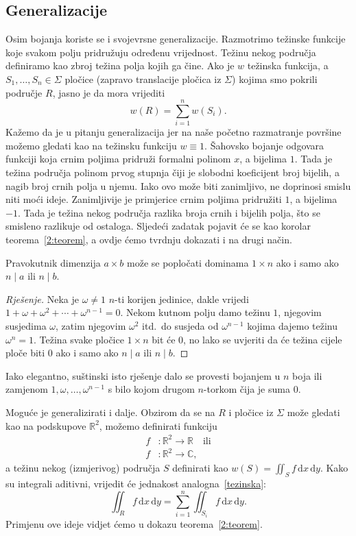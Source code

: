 \documentclass[11pt]{scrartcl}
\newcommand{\D}{\,\mathrm d}
\begin{document}
\subsection{Generalizacije}
Osim bojanja koriste se i svojevrsne generalizacije. Razmotrimo težinske funkcije koje svakom polju pridružuju određenu vrijednost. Težinu nekog područja definiramo kao zbroj težina polja kojih ga čine. Ako je $w$ težinska funkcija, a $S_1, \ldots, S_n \in \Sigma$ pločice (zapravo translacije pločica iz $\Sigma$) kojima smo pokrili područje $R$, jasno je da mora vrijediti
\begin{equation}\label{tezinska}
w(R) = \sum_{i = 1}^n w(S_i).
\end{equation}
Kažemo da je u pitanju generalizacija jer na naše početno razmatranje površine možemo gledati kao na težinsku funkciju $w \equiv 1$. Šahovsko bojanje odgovara funkciji koja crnim poljima pridruži formalni polinom $x$, a bijelima $1$. Tada je težina područja polinom prvog stupnja čiji je slobodni koeficijent broj bijelih, a nagib broj crnih polja u njemu. Iako ovo može biti zanimljivo, ne doprinosi smislu niti moći ideje. Zanimljivije je primjerice crnim poljima pridružiti $1$, a bijelima $-1$. Tada je težina nekog područja razlika broja crnih i bijelih polja, što se smisleno razlikuje od ostaloga. Sljedeći zadatak pojavit će se kao korolar teorema~\ref{2:teorem}, a ovdje ćemo tvrdnju dokazati i na drugi način.

\begin{zadatak}
Pravokutnik dimenzija $a \times b$ može se popločati dominama $1 \times n$ ako i samo ako $n \mid a$ ili $n \mid b$.
\end{zadatak}
\begin{proof}[Rješenje]
Neka je $\omega \neq 1$ $n$-ti korijen jedinice, dakle vrijedi $1 + \omega +\omega^2 + \dotsb + \omega^{n-1} = 0$. Nekom kutnom polju damo težinu $1$, njegovim susjedima $\omega$, zatim njegovim $\omega^2$ itd.\ do susjeda od $\omega^{n-1}$ kojima dajemo težinu $\omega^n = 1$. Težina svake pločice $1 \times n$ bit će $0$, no lako se uvjeriti da će težina cijele ploče biti $0$ ako i samo ako $n \mid a$ ili $n \mid b$.
\end{proof}
\begin{napomena}
Iako elegantno, suštinski isto rješenje dalo se provesti bojanjem u $n$ boja ili zamjenom $1, \omega, \ldots, \omega^{n-1}$ s bilo kojom drugom $n$-torkom čija je suma $0$.
\end{napomena}

Moguće je generalizirati i dalje. Obzirom da se na $R$ i pločice iz $\Sigma$ može gledati kao na podskupove $\mathbb{R}^2$, možemo definirati funkciju
\begin{align*}
f &\colon \mathbb{R}^2 \to \mathbb{R} \quad \text{ili}\\
f &\colon \mathbb{R}^2 \to \mathbb{C},
\end{align*}
a težinu nekog (izmjerivog) područja $S$ definirati kao
$w(S) = \iint_S f \D x \D y$.
Kako su integrali aditivni, vrijedit će jednakost analogna~\eqref{tezinska}:
\[
\iint_R f \D x \D y = \sum_{i=1}^n \iint_{S_i} f \D x \D y.
\]
Primjenu ove ideje vidjet ćemo u dokazu teorema~\ref{2:teorem}.
\end{document}
